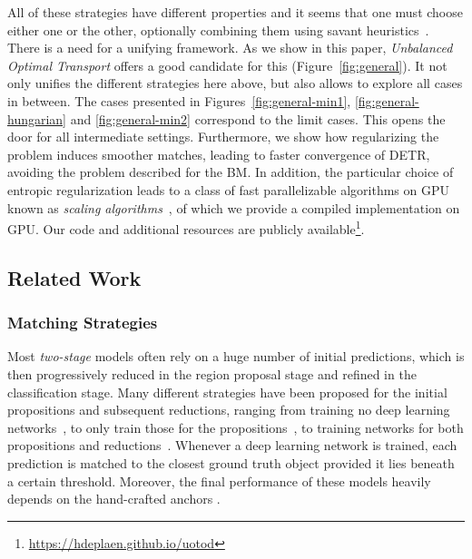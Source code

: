 All of these strategies have different properties and it seems that one must choose either one or the other, optionally combining them using savant heuristics~\cite{liu2016ssd}. There is a need for a unifying framework. As we show in this paper, \emph{Unbalanced Optimal Transport}\cite{chizat2018unbalanced} offers a good candidate for this (Figure~\ref{fig:general}). It not only unifies the different strategies here above, but also allows to explore all cases in between. The cases presented in Figures~\ref{fig:general-min1}, \ref{fig:general-hungarian} and \ref{fig:general-min2} correspond to the limit cases. This opens the door for all intermediate settings. Furthermore, we show how regularizing the problem induces smoother matches, leading to faster convergence of DETR, avoiding the problem described for the BM. In addition, the particular choice of entropic regularization leads to a class of fast parallelizable algorithms on GPU known as \emph{scaling algorithms}~\cite{cuturi2013sinkhorn,chizat2018scaling}, of which we provide a compiled implementation on GPU. Our code and additional resources are publicly available\footnote{\url{https://hdeplaen.github.io/uotod}}.



\subsection{Related Work}
\subsubsection{Matching Strategies}
Most \emph{two-stage} models often rely on a huge number of initial predictions, which is then progressively reduced in the region proposal stage and refined in the classification stage. Many different strategies have been proposed for the initial propositions and subsequent reductions, ranging from training no deep learning networks~\cite{girshick2014rcnn}, to only train those for the propositions~\cite{girshick2015fast, lin2017feature,he2015spatial}, to training networks for both propositions and reductions~\cite{ren2015fasterrcnn,pang2019libra,he2017maskrcnn, cai2018cascade, dai2016r}. Whenever a deep learning network is trained, each prediction is matched to the closest ground truth object provided it lies beneath a certain threshold. Moreover, the final performance of these models heavily depends on the hand-crafted anchors \cite{liu2020objectdetectionsurvey}.

